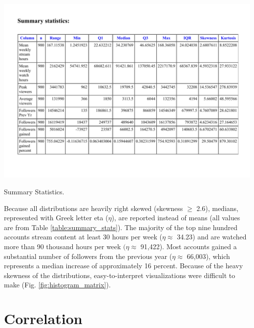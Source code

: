 \documentclass[12pt]{article}
\begin{document}
\begin{table}[H]
  \centering
  \includegraphics[width=0.8\linewidth]{../StatCrunch_Results/table}
  \captionsetup{justification=centering, singlelinecheck=false, margin=2cm}
  \caption[Summary Statistics]{Summary Statistics.}
  \label{table:summary_stats}
\end{table}

Because all distributions are heavily right skewed (skewness $\geq$ 2.6), medians, represented with Greek letter eta ($\eta$), are reported instead of means (all values are from Table \ref{table:summary_stats}). The majority of the top nine hundred accounts stream content at least 30 hours per week ($\eta \approx$ 34.23) and are watched more than 90 thousand hours per week $(\eta \approx$ 91,422). Most accounts gained a substantial number of followers from the previous year ($\eta \approx$ 66,003), which represents a median increase of approximately 16 percent. Because of the heavy skewness of the distributions, easy-to-interpret visualizations were difficult to make (Fig. \ref{fig:histogram_matrix}).

\section{Correlation}
\end{document}
